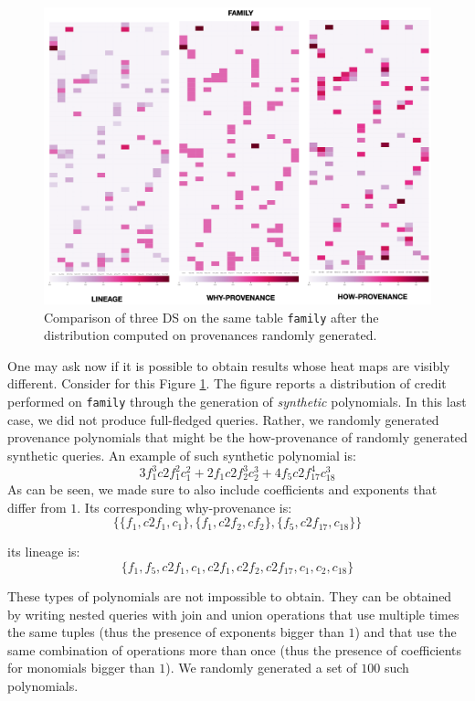 \begin{figure}[tb]
  \includegraphics[width=1\textwidth]{figures/synthetic_polynomials_2}
  \caption{Comparison of three DS on the same table \texttt{family} after the distribution computed on provenances randomly generated.}
  \label{figure:comparison_on_synthetic_polynomials_2}
\end{figure}

One may ask now if it is possible to obtain results whose heat maps are visibly different. 
Consider for this Figure \ref{figure:comparison_on_synthetic_polynomials_2}. 
The figure reports a distribution of credit performed on \texttt{family} through the generation of \emph{synthetic} polynomials. 
In this last case, we did not produce full-fledged queries. Rather, we randomly generated provenance polynomials that might be the how-provenance of randomly generated synthetic queries. 
An example of such synthetic polynomial is:
\[
3 f_1^3 c2f_1^2 c_1^2 + 2 f_1 c2f_2^3 c_2^3 + 4 f_5 c2f_{17}^4 c_{18}^3
\] 
As can be seen, we made sure to also include coefficients and exponents that differ from $1$.
Its corresponding why-provenance is: 
\[
\{ \{f_1, c2f_1, c_1\}, \{f_1, c2f_2, cf_2\}, \{ f_5, c2f_{17}, c_{18}\} \}
\] 

its lineage is: 
\[
\{f_1, f_5, c2f_1, c_1, c2f_1, c2f_2, c2f_{17}, c_1, c_2, c_{18} \}
\]
 
These types of polynomials are not impossible to obtain. 
They can be obtained by writing nested queries with join and union operations that use multiple times the same tuples (thus the presence of exponents bigger than $1$) and that use the same combination of operations more than once (thus the presence of coefficients for monomials bigger than $1$). 
We randomly generated a set of $100$ such polynomials. 

